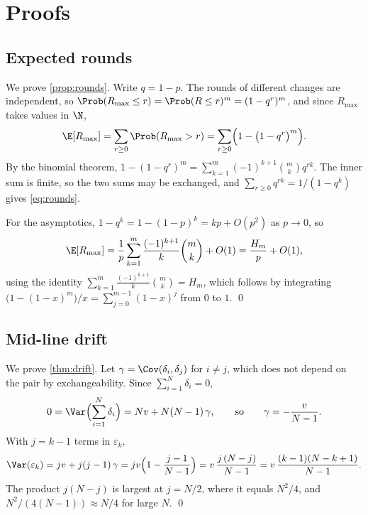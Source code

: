 \section{Proofs}
\label{app:proofs}

\subsection{Expected rounds}

We prove \cref{prop:rounds}. Write $q = 1 - p$. The rounds of different changes are independent, so
$\Prob(R_{\max} \le r) = \Prob(R \le r)^{m} = (1 - q^{r})^{m}$, and since
$R_{\max}$ takes values in $\N$,
\begin{equation}
  \E[R_{\max}] = \sum_{r \ge 0} \Prob(R_{\max} > r)
  = \sum_{r \ge 0} \Bigl( 1 - \bigl(1 - q^{r}\bigr)^{m} \Bigr).
\end{equation}
By the binomial theorem,
$1 - (1 - q^{r})^{m} = \sum_{k=1}^{m} (-1)^{k+1} \binom{m}{k} q^{rk}$. The inner
sum is finite, so the two sums may be exchanged, and
$\sum_{r \ge 0} q^{rk} = 1 / (1 - q^{k})$ gives \cref{eq:rounds}.

For the asymptotics, $1 - q^{k} = 1 - (1-p)^{k} = kp + O(p^2)$ as $p \to 0$, so
\begin{equation}
  \E[R_{\max}] = \frac{1}{p} \sum_{k=1}^{m} \frac{(-1)^{k+1}}{k} \binom{m}{k}
  + O(1)
  = \frac{H_m}{p} + O(1),
\end{equation}
using the identity $\sum_{k=1}^{m} \frac{(-1)^{k+1}}{k}\binom{m}{k} = H_m$,
which follows by integrating $\bigl(1 - (1-x)^{m}\bigr)/x
= \sum_{j=0}^{m-1} (1-x)^{j}$ from $0$ to $1$. \qed

\subsection{Mid-line drift}

We prove \cref{thm:drift}. Let $\gamma = \Cov(\delta_i, \delta_j)$ for $i \ne j$, which does not depend on the
pair by exchangeability. Since $\sum_{i=1}^{N} \delta_i = 0$,
\begin{equation}
  0 = \Var\Bigl(\sum_{i=1}^{N} \delta_i\Bigr) = N v + N(N-1)\, \gamma,
  \qquad\text{so}\qquad \gamma = -\frac{v}{N-1} .
\end{equation}
With $j = k - 1$ terms in $\varepsilon_k$,
\begin{equation}
  \Var(\varepsilon_k) = j v + j(j-1)\, \gamma
  = j v \Bigl(1 - \frac{j - 1}{N - 1}\Bigr)
  = v\, \frac{j\,(N - j)}{N - 1}
  = v\, \frac{(k-1)(N-k+1)}{N-1} .
\end{equation}
The product $j(N-j)$ is largest at $j = N/2$, where it equals $N^2/4$, and
$N^2/(4(N-1)) \approx N/4$ for large $N$. \qed

